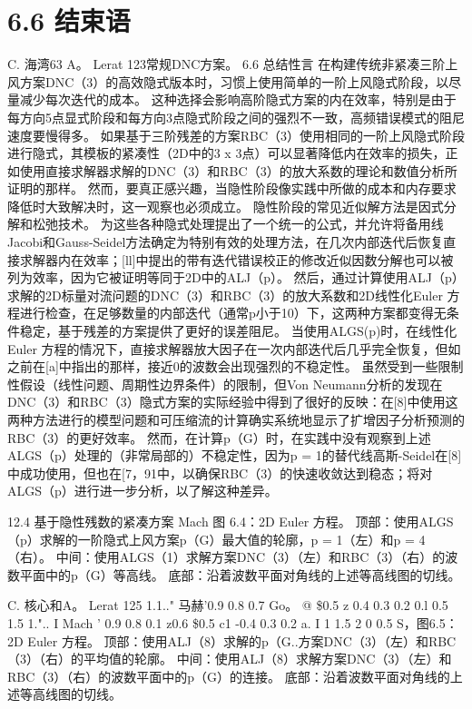 \documentclass[UTF8,11pt,a4paper,openany,fontset=fandol]{ctexbook}
\begin{document}
\section{6.6 结束语}
C. 海湾63 A。 Lerat 123常规DNC方案。 6.6 总结性言 在构建传统非紧凑三阶上风方案DNC（3）的高效隐式版本时，习惯上使用简单的一阶上风隐式阶段，以尽量减少每次迭代的成本。 这种选择会影响高阶隐式方案的内在效率，特别是由于每方向5点显式阶段和每方向3点隐式阶段之间的强烈不一致，高频错误模式的阻尼速度要慢得多。 如果基于三阶残差的方案RBC（3）使用相同的一阶上风隐式阶段进行隐式，其模板的紧凑性（2D中的3 x 3点）可以显著降低内在效率的损失，正如使用直接求解器求解的DNC（3）和RBC（3）的放大系数的理论和数值分析所证明的那样。 然而，要真正感兴趣，当隐性阶段像实践中所做的成本和内存要求降低时大致解决时，这一观察也必须成立。 隐性阶段的常见近似解方法是因式分解和松弛技术。 为这些各种隐式处理提出了一个统一的公式，并允许将备用线Jacobi和Gauss-Seidel方法确定为特别有效的处理方法，在几次内部迭代后恢复直接求解器内在效率；[ll]中提出的带有迭代错误校正的修改近似因数分解也可以被列为效率，因为它被证明等同于2D中的ALJ（p）。 然后，通过计算使用ALJ（p）求解的2D标量对流问题的DNC（3）和RBC（3）的放大系数和2D线性化Euler 方程进行检查，在足够数量的内部迭代（通常p小于10）下，这两种方案都变得无条件稳定，基于残差的方案提供了更好的误差阻尼。 当使用ALGS(p)时，在线性化Euler 方程的情况下，直接求解器放大因子在一次内部迭代后几乎完全恢复，但如之前在[a]中指出的那样，接近0的波数会出现强烈的不稳定性。 虽然受到一些限制性假设（线性问题、周期性边界条件）的限制，但Von Neumann分析的发现在DNC（3）和RBC（3）隐式方案的实际经验中得到了很好的反映：在[8]中使用这两种方法进行的模型问题和可压缩流的计算确实系统地显示了扩增因子分析预测的RBC（3）的更好效率。 然而，在计算p（G）时，在实践中没有观察到上述ALGS（p）处理的（非常局部的）不稳定性，因为p = 1的替代线高斯-Seidel在[8]中成功使用，但也在[7，91中，以确保RBC（3）的快速收敛达到稳态；将对ALGS（p）进行进一步分析，以了解这种差异。

12.4 基于隐性残数的紧凑方案 Mach 图 6.4：2D Euler 方程。 顶部：使用ALGS（p）求解的一阶隐式上风方案p（G）最大值的轮廓，p = 1（左）和p = 4（右）。 中间：使用ALGS（1）求解方案DNC（3）（左）和RBC（3）（右）的波数平面中的p（G）等高线。 底部：沿着波数平面对角线的上述等高线图的切线。

C. 核心和A。 Lerat 125 1.1.." 马赫'0.9 0.8 0.7 Go。 @ \$0.5 z 0.4 0.3 0.2 0.l 0.5 1.5 1.".. I Mach ' 0.9 0.8 0.1 z0.6 \$0.5 c1 -0.4 0.3 0.2 a. I 1 1.5 2 0 0.5 S，图6.5：2D Euler 方程。 顶部：使用ALJ（8）求解的p（G..方案DNC（3）（左）和RBC（3）（右）的平均值的轮廓。 中间：使用ALJ（8）求解方案DNC（3）（左）和RBC（3）（右）的波数平面中的p（G）的连接。 底部：沿着波数平面对角线的上述等高线图的切线。
\end{document}
